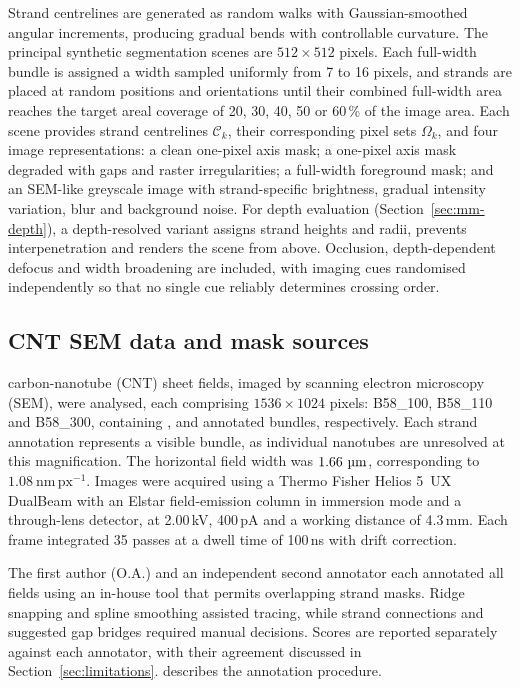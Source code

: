 Strand centrelines are generated as random walks with Gaussian-smoothed
angular increments, producing gradual bends with controllable curvature.
The principal synthetic segmentation scenes are $512\times512$ pixels.
Each full-width bundle is assigned a width sampled uniformly from 7 to 16
pixels, and strands are placed at random positions and orientations until
their combined full-width area reaches the target areal coverage of 20, 30,
40, 50 or 60\,\% of the image area. Each scene provides strand centrelines
$\mathcal C_k$, their corresponding pixel sets $\Omega_k$, and four image
representations: a clean one-pixel axis mask; a one-pixel axis mask degraded
with gaps and raster irregularities; a full-width foreground mask; and an
SEM-like greyscale image with
strand-specific brightness, gradual intensity variation, blur and background
noise. For depth evaluation (Section~\ref{sec:mm-depth}), a depth-resolved
variant assigns strand heights and radii, prevents interpenetration and
renders the scene from above. Occlusion, depth-dependent defocus and width
broadening are included, with imaging cues randomised independently so that
no single cue reliably determines crossing order.


\subsection{CNT SEM data and mask sources}
\label{sec:mm-real}

\PlectaRealFieldCountWord{} carbon-nanotube (CNT) sheet fields, imaged by
scanning electron microscopy (SEM), were analysed, each comprising
$1536\times1024$ pixels: B58\_100, B58\_110 and B58\_300, containing
\PlectaBFiveEightOneZeroZeroReferenceCount{},
\PlectaBFiveEightOneOneZeroReferenceCount{} and
\PlectaBFiveEightThreeZeroZeroReferenceCount{} annotated bundles, respectively.
Each strand annotation represents a visible bundle, as individual nanotubes
are unresolved at this magnification. The horizontal field width was
$1.66~\si{\micro\metre}$, corresponding to $1.08~\mathrm{nm\,px^{-1}}$. Images were acquired
using a Thermo Fisher Helios 5~UX DualBeam with an Elstar field-emission column
in immersion mode and a through-lens detector, at 2.00\,kV, 400\,pA and a
working distance of 4.3\,mm. Each frame integrated 35 passes at a dwell time
of 100\,ns with drift correction.

The first author (O.A.) and an independent second annotator each annotated
all \PlectaInterAnnotatorFieldCount{} fields using an in-house tool that permits
overlapping strand masks. Ridge snapping and spline smoothing assisted
tracing, while strand connections and suggested gap bridges required manual
decisions. Scores are reported separately against each annotator, with their
agreement discussed in
Section~\ref{sec:limitations}. \suppannotation{} describes the
annotation procedure.

